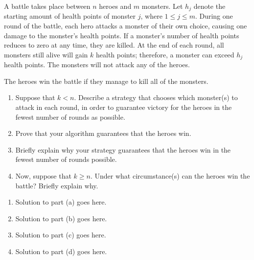 \documentclass{article}
\begin{document}
\begin{question}
A battle takes place between $n$ heroes and $m$ monsters. Let $h_j$ denote the starting amount of health points of monster $j$, where $1 \leq j \leq m$. During one round of the battle, each hero attacks a monster of their own choice, causing one damage to the monster's health points. If a monster's number of health points reduces to zero at any time, they are killed. At the end of each round, all monsters still alive will gain $k$ health points; therefore, a monster can exceed $h_j$ health points. The monsters will not attack any of the heroes.

The heroes win the battle if they manage to kill all of the monsters.

\begin{enumerate}[label = (\alph*)]
    \item Suppose that $k < n$. Describe a strategy that chooses which monster(s) to attack in each round, in order to guarantee victory for the heroes in the fewest number of rounds as possible.

    \item Prove that your algorithm guarantees that the heroes win.

    \item Briefly explain why your strategy guarantees that the heroes win in the fewest number of rounds possible.

    \item Now, suppose that $k \geq n$. Under what circumstance(s) can the heroes win the battle? Briefly explain why.
\end{enumerate}
\end{question}

\begin{solution}
\begin{enumerate}[label = (\alph*)]
    \item Solution to part (a) goes here.

    \item Solution to part (b) goes here.

    \item Solution to part (c) goes here.

    \item Solution to part (d) goes here.
\end{enumerate}
\end{solution}
\end{document}
